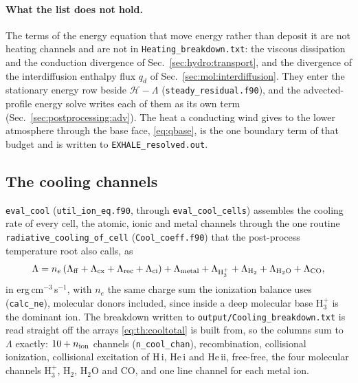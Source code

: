 \paragraph{What the list does not hold.} The terms of the energy equation
that move energy rather than deposit it are not heating channels and are
not in \texttt{Heating\_breakdown.txt}: the viscous dissipation and the
conduction divergence of Sec.~\ref{sec:hydro:transport}, and the divergence
of the interdiffusion enthalpy flux $q_d$ of
Sec.~\ref{sec:mol:interdiffusion}. They enter the stationary energy row
beside $\mathcal{H}-\Lambda$ (\texttt{steady\_residual.f90}), and the
advected-profile energy solve writes each of them as its own term
(Sec.~\ref{sec:postprocessing:adv}). The heat a conducting wind gives to the
lower atmosphere through the base face, \eqref{eq:qbase}, is the one boundary
term of that budget and is written to \texttt{EXHALE\_resolved.out}.

\subsection{The cooling channels}
\label{sec:thermal:cool}

\texttt{eval\_cool} (\texttt{util\_ion\_eq.f90}, through
\texttt{eval\_cool\_cells}) assembles the cooling rate
of every cell, the atomic, ionic and metal channels through the one routine
\texttt{radiative\_cooling\_of\_cell} (\texttt{Cool\_coeff.f90}) that the
post-process temperature root also calls, as
\begin{equation}
\Lambda = n_e\left(\Lambda_{\rm ff}+\Lambda_{\rm cx}
                 +\Lambda_{\rm rec}+\Lambda_{\rm ci}\right)
        + \Lambda_{\rm metal} + \Lambda_{\rm H_3^+}
        + \Lambda_{\rm H_2} + \Lambda_{\rm H_2O} + \Lambda_{\rm CO},
\label{eq:th:cooltotal}
\end{equation}
in erg\,cm$^{-3}$\,s$^{-1}$, with $n_e$ the same charge sum the ionization
balance uses (\texttt{calc\_ne}), molecular donors included, since inside a
deep molecular base H$_3^+$ is the dominant ion. The breakdown written to
\texttt{output/Cooling\_breakdown.txt} is read straight off the arrays
\eqref{eq:th:cooltotal} is built from, so the columns sum to $\Lambda$
exactly: $10+n_{\rm ion}$ channels (\texttt{n\_cool\_chan}), recombination,
collisional ionization, collisional excitation of H\,{\sc i}, He\,{\sc i} and
He\,{\sc ii}, free-free, the four molecular channels H$_3^+$, H$_2$, H$_2$O
and CO, and one line channel for each metal ion.

